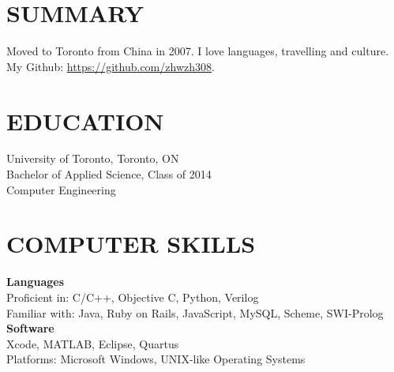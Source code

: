 \documentclass{res}
\begin{document}
 


\address{\bf Unit 808, 38 Dan Leckie Way\\Toronto, ON\space\space M5V 2V6\\(416)
795-0370\\\href{mailto:wenzhong.zhang@mail.utoronto.ca}{wenzhong.zhang@mail.utoronto.ca}}

\begin{resume}

\section{SUMMARY}          
    Moved to Toronto from China in 2007. I love languages, travelling and culture.
    My Github: \url{https://github.com/zhwzh308}.
 
\section{EDUCATION}          
    University of Toronto, Toronto, ON  \\        
    Bachelor of Applied Science, Class of 2014   \\       
    Computer Engineering
    
\section{COMPUTER SKILLS}          
    {\bf Languages}\\Proficient in: C/C++, Objective C, Python, Verilog\\
    Familiar with: Java, Ruby on Rails, JavaScript, MySQL, Scheme, SWI-Prolog\\
    {\bf Software}\\Xcode, MATLAB, Eclipse, Quartus\\
    Platforms: Microsoft Windows\textregistered, UNIX-like Operating Systems


\end{resume}
\end{document}
